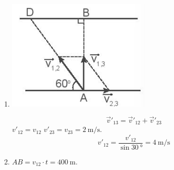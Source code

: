 \begin{ex}
{\begin{enumerate}[label=\alph*)]
			$$\vec v_{13}=\vec v_{12}+\vec v_{23}$$
			 $v_{12}=\dfrac{AB}{t}$  $v_{23}=\dfrac{BC}{t}=\dfrac{\SI{200}{\meter}}{\SI{100}{\second}}=\SI{2}{\meter/\second}$.\\
			\item {}
			\begin{center}
				\includegraphics[scale=0.5]{figs/G10Y25B5-13}
			\end{center}
			$$\overrightarrow v'_{13}=\overrightarrow v'_{12}+\overrightarrow v'_{23}$$
			 $v'_{12}=v_{12}$  $v'_{23}=v_{23}=\SI{2}{\meter/\second}$.\\
			$$v'_{12}=\dfrac{v'_{12}}{\sin\SI{30}{\degree}}=\SI{4}{\meter/\second}$$
			\item $AB=v_{12}\cdot t=\SI{400}{\meter}$.
		\end{enumerate}
	}
\end{ex}
